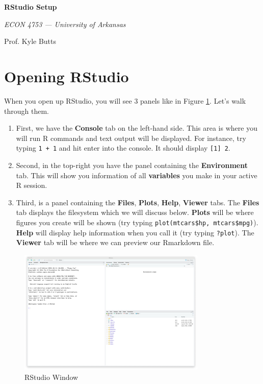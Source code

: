 \documentclass[12pt]{article}
\begin{document}
\begin{center}
  {\Huge\bf RStudio Setup}
  
  \smallskip
  {\large\it  ECON 4753 — University of Arkansas}

  \medskip
  {\large Prof. Kyle Butts}
\end{center}

\section*{Opening RStudio}

When you open up RStudio, you will see 3 panels like in Figure \ref{fig:rstudio}. Let's walk through them. 
\begin{enumerate}
  \item First, we have the \textbf{Console} tab on the left-hand side. This area is where you will run R commands and text output will be displayed. For instance, try typing \texttt{1 + 1} and hit enter into the console. It should display \texttt{[1] 2}.
  
  \item Second, in the top-right you have the panel containing the \textbf{Environment} tab. This will show you information of all \textbf{variables} you make in your active R session. 
  
  \item Third, is a panel containing the \textbf{Files}, \textbf{Plots}, \textbf{Help}, \textbf{Viewer} tabs. The \textbf{Files} tab displays the filesystem which we will discuss below. \textbf{Plots} will be where figures you create will be shown (try typing \texttt{plot(mtcars\$hp, mtcars\$mpg)}). \textbf{Help} will display help information when you call it (try typing \texttt{?plot}). The \textbf{Viewer} tab will be where we can preview our Rmarkdown file.
\end{enumerate}



\begin{figure}[!ht]
  \caption{RStudio Window}
  \label{fig:rstudio}
  \centering
  \includegraphics[width = 0.8\textwidth]{figures/rstudio.png}
\end{figure}
\end{document}

